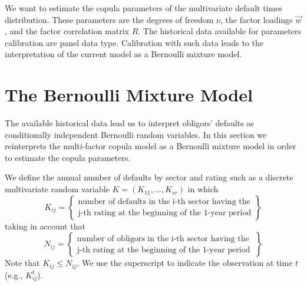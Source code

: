\documentclass[11pt,fleqn]{book} %
\begin{document}
We want to estimate the copula parameters of the multivariate default times
distribution. These parameters are the degrees of freedom $\nu$, the factor 
loadings $\vec{w}$, and the factor correlation matrix $R$. The historical 
data available for parameters calibration are panel data type. Calibration 
with such data leads to the interpretation of the current model as a Bernoulli 
mixture model.

\section{The Bernoulli Mixture Model}

The available historical data lead us to interpret obligors' defaults as 
conditionally independent Bernoulli random variables. In this section we 
reinterprets the multi-factor copula model as a Bernoulli mixture model in 
order to estimate the copula parameters.

\begin{definition}
	We define the annual number of defaults by sector and rating such as a
	discrete multivariate random variable $K=(K_{11}, \dots, K_{sr})$ in which
	\begin{displaymath}
		K_{ij} = \left\{
		\begin{array}{c}
			\text{number of defaults in the i-th sector having the} \\
			\text{j-th rating at the beginning of the 1-year period}
		\end{array}
		\right\}
	\end{displaymath}
	taking in account that
	\begin{displaymath}
		N_{ij} = \left\{
		\begin{array}{c}
			\text{number of obligors in the i-th sector having the } \\
			\text{j-th rating at the beginning of the 1-year period}
		\end{array}
		\right\}
	\end{displaymath}
	Note that $K_{ij} \le N_{ij}$. We use the superscript to indicate 
	the observation at time $t$ (e.g., $K_{ij}^t$).
\end{definition}
\end{document}
